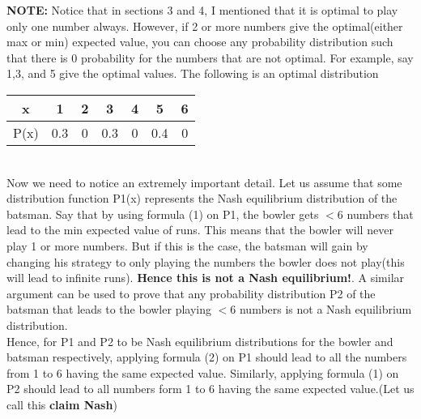 \documentclass{article}
\begin{document}
\textbf{NOTE:} Notice that in sections 3 and 4, I mentioned that it is optimal to play only one number always. However, if 2 or more numbers give the optimal(either max or min) expected value, you can choose any probability distribution such that there is 0 probability for the numbers that are not optimal. For example, say 1,3, and 5 give the optimal values. The following is an optimal distribution

\begin{tabular}{|c|c|c|c|c|c|c|}
    \hline
    x & 1 & 2 & 3 & 4 & 5 & 6\\\hline
    P(x) & 0.3 & 0 & 0.3 & 0 & 0.4 & 0\\\hline
\end{tabular}
\\
Now we need to notice an extremely important detail. Let us assume that some distribution function P1(x) represents the Nash equilibrium distribution of the batsman. Say that by using formula (1) on P1, the bowler gets $<6$ numbers that lead to the min expected value of runs. This means that the bowler will never play 1 or more numbers. 
But if this is the case, the batsman will gain by changing his strategy to only playing the numbers the bowler does not play(this will lead to infinite runs). \textbf{Hence this is not a Nash equilibrium!}. A similar argument can be used to prove that any probability distribution P2 of the batsman that leads to the bowler playing $<6$ numbers is not a Nash equilibrium distribution.
\\
Hence, for P1 and P2 to be Nash equilibrium distributions for the bowler and batsman respectively, applying formula (2) on P1 should lead to all the numbers from 1 to 6 having the same expected value. Similarly, applying formula (1) on P2 should lead to all numbers form 1 to 6 having the same expected value.(Let us call this \textbf{claim Nash})
\end{document}
